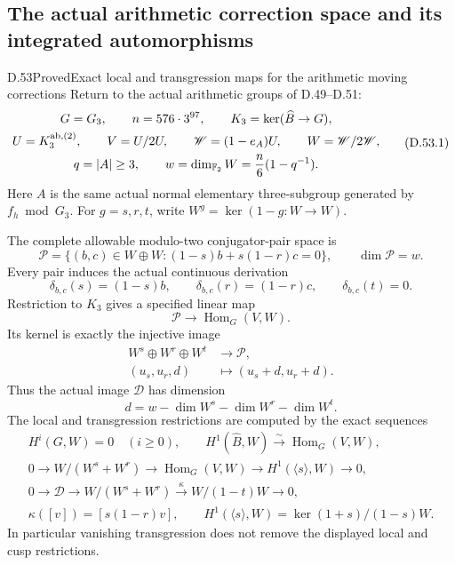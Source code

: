 \subsection{The actual arithmetic correction space and its integrated automorphisms}

\begin{statement}{D.53}{Proved}{Exact local and transgression maps for the arithmetic moving corrections}
Return to the actual arithmetic groups of D.49--D.51:
\[
 \begin{gathered}
 G=G_3,\qquad n=576\cdot3^{97},\qquad
 K_3=\ker(\widehat B\to G),\\
 U=K_3^{\rm ab,(2)},\qquad V=U/2U,\qquad
 \mathscr W=(1-e_A)U,\qquad W=\mathscr W/2\mathscr W,\\
 q=|A|\ge3,\qquad
 w=\dim_{\mathbb F_2}W={n\over6}(1-q^{-1}).
 \end{gathered}
 \tag{D.53.1}
\]
Here \(A\) is the same actual normal elementary
three-subgroup generated by \(f_h\bmod G_3\).
For \(g=s,r,t\), write \(W^g=\ker(1-g:W\to W)\).

The complete allowable modulo-two conjugator-pair
space is
\[
 \mathcal P=
 \{(b,c)\in W\oplus W:(1-s)b+s(1-r)c=0\},
 \qquad \dim\mathcal P=w .
 \tag{D.53.2}
\]
Every pair induces the actual continuous derivation
\[
 \delta_{b,c}(s)=(1-s)b,\qquad
 \delta_{b,c}(r)=(1-r)c,\qquad
 \delta_{b,c}(t)=0 .
 \tag{D.53.3}
\]
Restriction to \(K_3\) gives a specified linear map
\[
       \mathcal P\longrightarrow\operatorname{Hom}_G(V,W).
 \tag{D.53.4}
\]
Its kernel is exactly the injective image
\[
 \begin{aligned}
 W^s\oplus W^r\oplus W^t&\longrightarrow\mathcal P,\\
 (u_s,u_r,d)&\longmapsto(u_s+d,u_r+d).
 \end{aligned}
 \tag{D.53.5}
\]
Thus the actual image \(\mathscr D\) has dimension
\[
       d=w-\dim W^s-\dim W^r-\dim W^t .
 \tag{D.53.6}
\]
The local and transgression restrictions are
computed by the exact sequences
\[
 \begin{gathered}
 H^i(G,W)=0\quad(i\ge0),\qquad
 H^1(\widehat B,W)\xrightarrow{\sim}\operatorname{Hom}_G(V,W),\\
 0\longrightarrow W/(W^s+W^r)
  \longrightarrow\operatorname{Hom}_G(V,W)
  \longrightarrow H^1(\langle s\rangle,W)
  \longrightarrow0,\\
 0\longrightarrow\mathscr D
  \longrightarrow W/(W^s+W^r)
  \xrightarrow{\ \kappa\ }W/(1-t)W
  \longrightarrow0,\\
 \kappa([v])=[s(1-r)v],\qquad
 H^1(\langle s\rangle,W)=\ker(1+s)/(1-s)W .
 \end{gathered}
 \tag{D.53.7}
\]
In particular vanishing transgression does not
remove the displayed local and cusp restrictions.


\end{statement}
